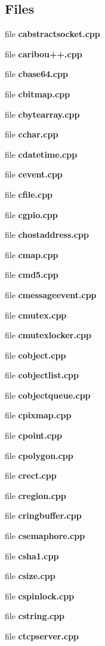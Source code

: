 \subsection*{Files}
\begin{DoxyCompactItemize}
\item 
file {\bf cabstractsocket.\+cpp}
\item 
file {\bf caribou++.\+cpp}
\item 
file {\bf cbase64.\+cpp}
\item 
file {\bf cbitmap.\+cpp}
\item 
file {\bf cbytearray.\+cpp}
\item 
file {\bf cchar.\+cpp}
\item 
file {\bf cdatetime.\+cpp}
\item 
file {\bf cevent.\+cpp}
\item 
file {\bf cfile.\+cpp}
\item 
file {\bf cgpio.\+cpp}
\item 
file {\bf chostaddress.\+cpp}
\item 
file {\bf cmap.\+cpp}
\item 
file {\bf cmd5.\+cpp}
\item 
file {\bf cmessageevent.\+cpp}
\item 
file {\bf cmutex.\+cpp}
\item 
file {\bf cmutexlocker.\+cpp}
\item 
file {\bf cobject.\+cpp}
\item 
file {\bf cobjectlist.\+cpp}
\item 
file {\bf cobjectqueue.\+cpp}
\item 
file {\bf cpixmap.\+cpp}
\item 
file {\bf cpoint.\+cpp}
\item 
file {\bf cpolygon.\+cpp}
\item 
file {\bf crect.\+cpp}
\item 
file {\bf cregion.\+cpp}
\item 
file {\bf cringbuffer.\+cpp}
\item 
file {\bf csemaphore.\+cpp}
\item 
file {\bf csha1.\+cpp}
\begin{DoxyCompactList}\small\item\em 

 \end{DoxyCompactList}\item 
file {\bf csize.\+cpp}
\item 
file {\bf cspinlock.\+cpp}
\item 
file {\bf cstring.\+cpp}
\item 
file {\bf ctcpserver.\+cpp}
\begin{DoxyCompactList}\small\item\em 


\end{DoxyCompactList}
\end{DoxyCompactItemize}
